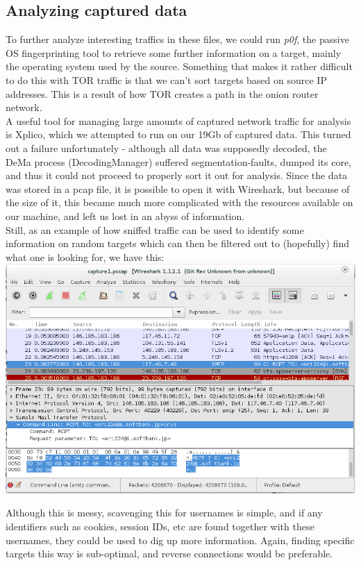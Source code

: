 \subsection{Analyzing captured data}
To further analyze interesting traffics in these files, we could run \textit{p0f}, the passive OS fingerprinting tool to retrieve some further information on a target, mainly the operating system used by the source. Something that makes it rather difficult to do this with TOR traffic is that we can't sort targets based on source IP addresses. This is a result of how TOR creates a path in the onion router network.\\

A useful tool for managing large amounts of captured network traffic for analysis is Xplico, which we attempted to run on our 19Gb of captured data. This turned out a failure unfortunately - although all data was supposedly decoded, the DeMa process (DecodingManager) suffered segmentation-faults, dumped its core, and thus it could not proceed to properly sort it out for analysis. Since the data was stored in a pcap file, it is possible to open it with Wireshark, but because of the size of it, this became much more complicated with the resources available on our machine, and left us lost in an abyss of information.\\

Still, as an example of how sniffed traffic can be used to identify some information on random targets which can then be filtered out to (hopefully) find what one is looking for, we have this:\\

\includegraphics[scale=0.5]{wireshark.png}

Although this is messy, scavenging this for usernames is simple, and if any identifiers such as cookies, session IDs, etc are found together with these usernames, they could be used to dig up more information. Again, finding specific targets this way is sub-optimal, and reverse connections would be preferable.\\

